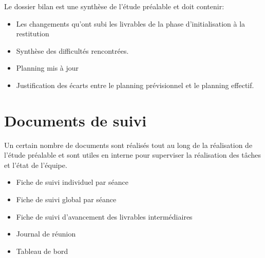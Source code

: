 		Le dossier bilan est une synthèse de l'étude préalable et doit contenir:

		\begin{itemize}
		    \item Les changements qu'ont subi les livrables de la phase d'initialisation à la restitution
		    \item Synthèse des difficultés rencontrées.
		    \item Planning mis à jour
		    \item Justification des écarts entre le planning prévisionnel et le planning effectif.
		\end{itemize}



	\section{Documents de suivi}

		Un certain nombre de documents sont réalisés tout au long de la réalisation de l'étude préalable et sont utiles en interne pour superviser la réalisation des tâches et l'état de l'équipe.

		\begin{itemize}
		    \item Fiche de suivi individuel par séance
		    \item Fiche de suivi global par séance
		    \item Fiche de suivi d’avancement des livrables intermédiaires
		    \item Journal de réunion
		    \item Tableau de bord
		\end{itemize}